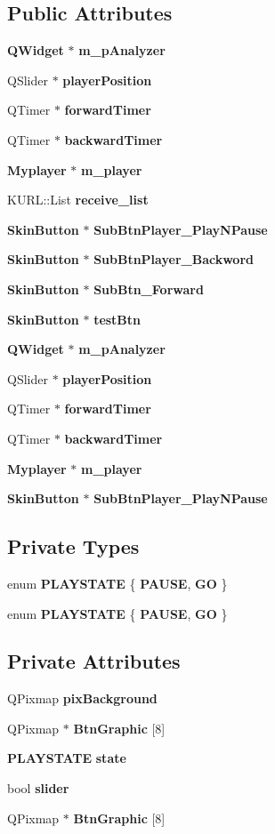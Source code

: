 \subsection*{Public Attributes}
\begin{CompactItemize}
\item 
{\bf QWidget} $\ast$ {\bf m\_\-p\-Analyzer}
\item 
QSlider $\ast$ {\bf player\-Position}
\item 
QTimer $\ast$ {\bf forward\-Timer}
\item 
QTimer $\ast$ {\bf backward\-Timer}
\item 
{\bf Myplayer} $\ast$ {\bf m\_\-player}
\item 
KURL::List {\bf receive\_\-list}
\item 
{\bf Skin\-Button} $\ast$ {\bf Sub\-Btn\-Player\_\-Play\-NPause}
\item 
{\bf Skin\-Button} $\ast$ {\bf Sub\-Btn\-Player\_\-Backword}
\item 
{\bf Skin\-Button} $\ast$ {\bf Sub\-Btn\_\-Forward}
\item 
{\bf Skin\-Button} $\ast$ {\bf test\-Btn}
\item 
{\bf QWidget} $\ast$ {\bf m\_\-p\-Analyzer}
\item 
QSlider $\ast$ {\bf player\-Position}
\item 
QTimer $\ast$ {\bf forward\-Timer}
\item 
QTimer $\ast$ {\bf backward\-Timer}
\item 
{\bf Myplayer} $\ast$ {\bf m\_\-player}
\item 
{\bf Skin\-Button} $\ast$ {\bf Sub\-Btn\-Player\_\-Play\-NPause}
\end{CompactItemize}
\subsection*{Private Types}
\begin{CompactItemize}
\item 
enum {\bf PLAYSTATE} \{ {\bf PAUSE}, 
{\bf GO}
 \}
\item 
enum {\bf PLAYSTATE} \{ {\bf PAUSE}, 
{\bf GO}
 \}
\end{CompactItemize}
\subsection*{Private Attributes}
\begin{CompactItemize}
\item 
QPixmap {\bf pix\-Background}
\item 
QPixmap $\ast$ {\bf Btn\-Graphic} [8]
\item 
{\bf PLAYSTATE} {\bf state}
\item 
bool {\bf slider}
\item 
QPixmap $\ast$ {\bf Btn\-Graphic} [8]
\end{CompactItemize}



